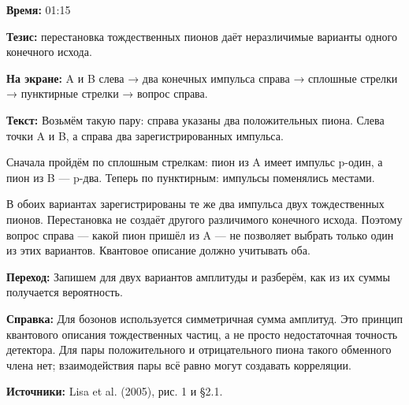 \textbf{Время:} 01:15

\textbf{Тезис:} перестановка тождественных пионов даёт неразличимые варианты одного конечного исхода.

\textbf{На экране:} A и B слева → два конечных импульса справа → сплошные стрелки → пунктирные стрелки → вопрос справа.

\textbf{Текст:} Возьмём такую пару: справа указаны два положительных пиона. Слева точки A и B, а справа два зарегистрированных импульса.

Сначала пройдём по сплошным стрелкам: пион из A имеет импульс p-один, а пион из B — p-два. Теперь по пунктирным: импульсы поменялись местами.

В обоих вариантах зарегистрированы те же два импульса двух тождественных пионов. Перестановка не создаёт другого различимого конечного исхода. Поэтому вопрос справа — какой пион пришёл из A — не позволяет выбрать только один из этих вариантов. Квантовое описание должно учитывать оба.

\textbf{Переход:} Запишем для двух вариантов амплитуды и разберём, как из их суммы получается вероятность.

\textbf{Справка:} Для бозонов используется симметричная сумма амплитуд. Это принцип квантового описания тождественных частиц, а не просто недостаточная точность детектора. Для пары положительного и отрицательного пиона такого обменного члена нет; взаимодействия пары всё равно могут создавать корреляции.

\textbf{Источники:} Lisa et al. (2005), рис. 1 и §2.1.
